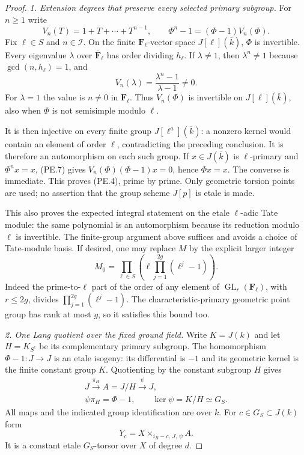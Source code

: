 \begin{proof}
\emph{1. Extension degrees that preserve every selected primary subgroup.}
For $n\ge1$ write
\[
 V_n(T)=1+T+\cdots+T^{n-1},\qquad
              \Phi^n-1=(\Phi-1)V_n(\Phi).
 \tag{PE.7}
\]
Fix $\ell\in S$ and $n\in\mathcal I$. On the finite
$\mathbf F_\ell$-vector space $J[\ell](\overline k)$,
$\Phi$ is invertible. Every eigenvalue $\lambda$ over
$\overline{\mathbf F}_\ell$ has order dividing $h_\ell$.
If $\lambda\ne1$, then $\lambda^n\ne1$ because
$\gcd(n,h_\ell)=1$, and
\[
 V_n(\lambda)=\frac{\lambda^n-1}{\lambda-1}\ne0.
\]
For $\lambda=1$ the value is $n\ne0$ in $\mathbf F_\ell$.
Thus $V_n(\Phi)$ is invertible on $J[\ell](\overline k)$,
also when $\Phi$ is not semisimple modulo $\ell$.

It is then injective on every finite group
$J[\ell^a](\overline k)$: a nonzero kernel would contain an
element of order $\ell$, contradicting the preceding conclusion.
It is therefore an automorphism on each such group. If
$x\in J(\overline k)$ is $\ell$-primary and $\Phi^n x=x$,
(PE.7) gives $V_n(\Phi)(\Phi-1)x=0$, hence $\Phi x=x$.
The converse is immediate. This proves (PE.4), prime by prime.
Only geometric torsion points are used; no assertion that the
group scheme $J[p]$ is etale is made.

This also proves the expected integral statement on the etale
$\ell$-adic Tate module: the same polynomial is an automorphism
because its reduction modulo $\ell$ is invertible. The finite-group
argument above suffices and avoids a choice of Tate-module basis.
If desired, one may replace $M$ by the explicit larger integer
\[
        M_0=\prod_{\ell\in S}
                   \left(\ell\prod_{j=1}^{2g}(\ell^j-1)\right).
 \tag{PE.8}
\]
Indeed the prime-to-$\ell$ part of the order of any element of
$\operatorname{GL}_r(\mathbf F_\ell)$, with $r\le2g$, divides
$\prod_{j=1}^{2g}(\ell^j-1)$. The characteristic-primary geometric
point group has rank at most $g$, so it satisfies this bound too.

\emph{2. One Lang quotient over the fixed ground field.}
Write $K=J(k)$ and let $H=K_{S^c}$ be its complementary primary
subgroup. The homomorphism $\Phi-1:J\to J$ is an etale isogeny:
its differential is $-1$ and its geometric kernel is the finite
constant group $K$. Quotienting by the constant subgroup $H$
gives
\[
 \begin{gathered}
 J\xrightarrow{\pi_H} A=J/H\xrightarrow{\psi}J,\\
       \psi\pi_H=\Phi-1,\qquad\ker\psi=K/H\simeq G_S.
 \end{gathered}
 \tag{PE.9}
\]
All maps and the indicated group identification are over $k$.
For $c\in G_S\subset J(k)$ form
\[
       Y_c=X\times_{i_B-c,\,J,\,\psi} A.
 \tag{PE.10}
\]
It is a constant etale $G_S$-torsor over $X$ of degree $d$.


\end{proof}
